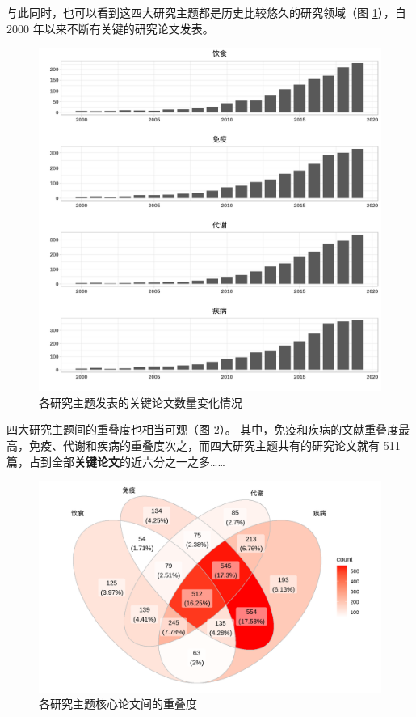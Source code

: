 \documentclass[]{ctexbook}
\begin{document}
与此同时，也可以看到这四大研究主题都是历史比较悠久的研究领域（图 \ref{fig:topic-trend-in-core-articles}），自 2000 年以来不断有关键的研究论文发表。

\begin{figure}
\includegraphics[width=1\linewidth]{plots/topic-trend-in-core-articles-1} \caption{各研究主题发表的关键论文数量变化情况}\label{fig:topic-trend-in-core-articles}
\end{figure}

四大研究主题间的重叠度也相当可观（图 \ref{fig:overlap-of-topic-in-core-article}）。 其中，免疫和疾病的文献重叠度最高，免疫、代谢和疾病的重叠度次之，而四大研究主题共有的研究论文就有 511 篇，占到全部\textbf{关键论文}的近六分之一之多\ldots\ldots{}

\begin{figure}
\includegraphics[width=1\linewidth]{plots/overlap-of-topic-in-core-article-1} \caption{各研究主题核心论文间的重叠度}\label{fig:overlap-of-topic-in-core-article}
\end{figure}
\end{document}
